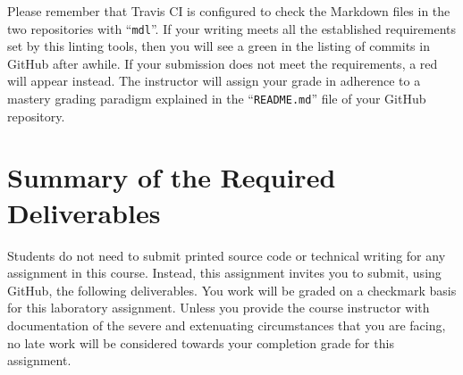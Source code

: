 \documentclass[11pt]{article}
\newcommand{\command}[1]{``\lstinline{#1}''}
\newcommand{\checkmark}{\ding{51}}
\newcommand{\naughtmark}{\ding{55}}
\begin{document}


Please remember that Travis CI is configured to check the Markdown files in the
two repositories with \command{mdl}.
%
If your writing meets all the established requirements set by this linting
tools, then you will see a green \checkmark{} in the listing of commits in
GitHub after awhile. If your submission does not meet the requirements, a red
\naughtmark{} will appear instead. The instructor will assign your grade in
adherence to a mastery grading paradigm explained in the \command{README.md}
file of your GitHub repository.



\section*{Summary of the Required Deliverables}

\noindent Students do not need to submit printed source code or technical
writing for any assignment in this course. Instead, this assignment invites you
to submit, using GitHub, the following deliverables. You work will be graded on
a checkmark basis for this laboratory assignment.
%
Unless you provide the course instructor with documentation of the severe and
extenuating circumstances that you are facing, no late work will be considered
towards your completion grade for this assignment.
\end{document}
